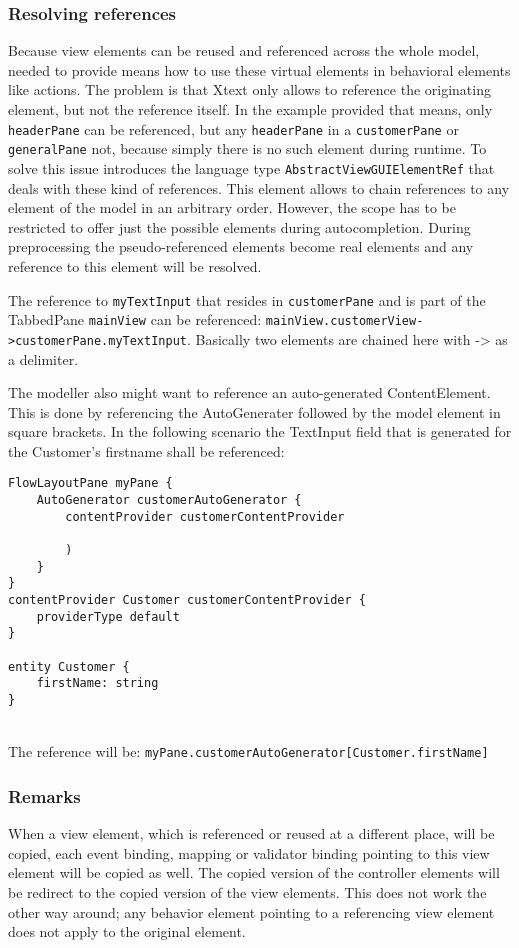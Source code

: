 \subsubsection{Resolving references}
Because view elements can be reused and referenced across the whole model, \MD needed to provide means how to use these virtual elements in behavioral elements like actions. The problem is that Xtext only allows to reference the originating element, but not the reference itself. In the example provided that means, only \lstinline!headerPane! can be referenced, but any \lstinline!headerPane! in a \lstinline!customerPane! or \lstinline!generalPane! not, because simply there is no such element during runtime. To solve this issue \MD introduces the language type \lstinline!AbstractViewGUIElementRef! that deals with these kind of references. This element allows to chain references to any element of the model in an arbitrary order. However, the scope has to be restricted to offer just the possible elements during autocompletion. During preprocessing the pseudo-referenced elements become real elements and any reference to this element will be resolved.

The reference to \lstinline!myTextInput! that resides in \lstinline!customerPane! and is part of the TabbedPane \lstinline!mainView! can be referenced: \lstinline!mainView.customerView->customerPane.myTextInput!. Basically two elements are chained here with -> as a delimiter.

The modeller also might want to reference an auto-generated ContentElement. This is done by referencing the AutoGenerater followed by the model element in square brackets. In the following scenario the TextInput field that is generated for the Customer’s firstname shall be referenced:

\begin{lstlisting}[language=MD2]
FlowLayoutPane myPane {
	AutoGenerator customerAutoGenerator {
		contentProvider customerContentProvider
		
		)
	}
}
contentProvider Customer customerContentProvider {
	providerType default
}

entity Customer {
	firstName: string
}
\end{lstlisting}
~
\\
The reference will be: \lstinline!myPane.customerAutoGenerator[Customer.firstName]!

\subsubsection{Remarks}
When a view element, which is referenced or reused at a different place, will be copied, each event binding, mapping or validator binding pointing to this view element will be copied as well. The copied version of the controller elements will be redirect to the copied version of the view elements. This does not work the other way around; any behavior element pointing to a referencing view element does not apply to the original element.

